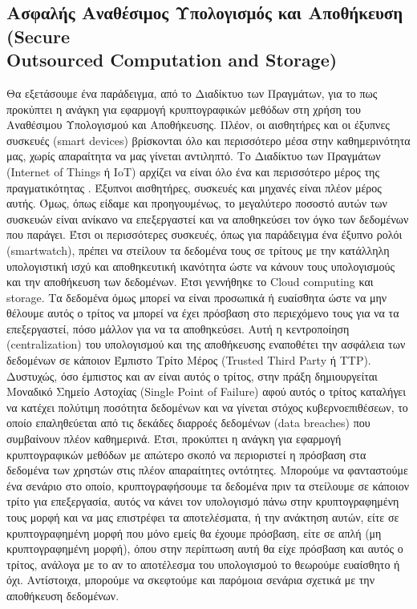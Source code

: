 \subsection[Ασφαλής Αναθέσιμος Υπολογισμός και Αποθήκευση (Secure Outsourced Computation and Storage)]{Ασφαλής Αναθέσιμος Υπολογισμός και Αποθήκευση (Secure \\ Outsourced Computation and Storage)}
Θα εξετάσουμε ένα παράδειγμα, από το Διαδίκτυο των Πραγμάτων, για το πως προκύπτει η ανάγκη για εφαρμογή κρυπτογραφικών μεθόδων στη χρήση του Αναθέσιμου Υπολογισμού και Αποθήκευσης. Πλέον, οι αισθητήρες και οι έξυπνες συσκευές (smart devices) βρίσκονται όλο και περισσότερο μέσα στην καθημερινότητα μας, χωρίς απαραίτητα να μας γίνεται αντιληπτό. Το Διαδίκτυο των Πραγμάτων (Internet of Things ή IoT) αρχίζει να είναι όλο ένα και περισσότερο μέρος της πραγματικότητας \cite{gershenfeld2004internet} \cite{li2015internet} . Έξυπνοι αισθητήρες, συσκευές και μηχανές είναι πλέον μέρος αυτής. Όμως, όπως είδαμε και προηγουμένως, το μεγαλύτερο ποσοστό αυτών των συσκευών είναι ανίκανο να επεξεργαστεί και να αποθηκεύσει τον όγκο των δεδομένων που παράγει. Έτσι οι περισσότερες συσκευές, όπως για παράδειγμα ένα έξυπνο ρολόι (smartwatch), πρέπει να στείλουν τα δεδομένα τους σε τρίτους με την κατάλληλη υπολογιστική ισχύ και αποθηκευτική ικανότητα ώστε να κάνουν τους υπολογισμούς και την αποθήκευση των δεδομένων. Έτσι γεννήθηκε το Cloud computing και storage. Τα δεδομένα όμως μπορεί να είναι προσωπικά ή ευαίσθητα ώστε να μην θέλουμε αυτός ο τρίτος να μπορεί να έχει πρόσβαση στο περιεχόμενο τους για να τα επεξεργαστεί, πόσο μάλλον για να τα αποθηκεύσει. Αυτή η κεντροποίηση (centralization) του υπολογισμού και της αποθήκευσης εναποθέτει την ασφάλεια των δεδομένων σε κάποιον Έμπιστο Τρίτο Μέρος (Trusted Third Party ή TTP). Δυστυχώς, όσο έμπιστος και αν είναι αυτός ο τρίτος, στην πράξη δημιουργείται Μοναδικό Σημείο Αστοχίας (Single Point of Failure) αφού αυτός ο τρίτος καταλήγει να κατέχει πολύτιμη ποσότητα δεδομένων και να γίνεται στόχος κυβερνοεπιθέσεων, το οποίο επαληθεύεται από τις δεκάδες διαρροές δεδομένων (data breaches) που συμβαίνουν πλέον καθημερινά. Έτσι, προκύπτει η ανάγκη για εφαρμογή κρυπτογραφικών μεθόδων με απώτερο σκοπό να περιοριστεί η πρόσβαση στα δεδομένα των χρηστών στις πλέον απαραίτητες οντότητες. Μπορούμε να φανταστούμε ένα σενάριο στο οποίο, κρυπτογραφήσουμε τα δεδομένα πριν τα στείλουμε σε κάποιον τρίτο για επεξεργασία, αυτός να κάνει τον υπολογισμό πάνω στην κρυπτογραφημένη τους μορφή και να μας επιστρέφει τα αποτελέσματα, ή την ανάκτηση αυτών, είτε σε κρυπτογραφημένη μορφή που μόνο εμείς θα έχουμε πρόσβαση, είτε σε απλή (μη κρυπτογραφημένη μορφή), όπου στην περίπτωση αυτή θα είχε πρόσβαση και αυτός ο τρίτος, ανάλογα με το αν το αποτέλεσμα του υπολογισμού το θεωρούμε ευαίσθητο ή όχι. Αντίστοιχα, μπορούμε να σκεφτούμε και παρόμοια σενάρια σχετικά με την αποθήκευση δεδομένων.

